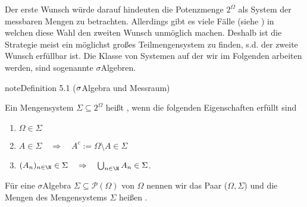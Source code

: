 \documentclass[letterpaper,10pt,german]{jupyterBook}
\begin{document}
\sphinxAtStartPar
Der erste Wunsch würde darauf hindeuten die Potenzmenge \(2^\Omega\) als System der messbaren Mengen zu betrachten. Allerdings gibt es viele Fälle (siehe {\hyperref[\detokenize{masstheorie/masstheorie:s-vitali}]{}}) in welchen diese Wahl den zweiten Wunsch unmöglich machen. Deshalb ist die Strategie meist ein möglichst großes Teilmengensystem zu finden, s.d. der zweite Wunsch erfüllbar ist. Die Klasse von Systemen auf der wir im Folgenden arbeiten werden, sind sogenannte \(\sigma\)\sphinxhyphen{}Algebren.
\label{masstheorie/masstheorie:def:sigmaalgebra}
\begin{sphinxadmonition}{note}{Definition 5.1 (\protect\(\sigma\protect\)\sphinxhyphen{}Algebra und Messraum)}



\sphinxAtStartPar
Ein Mengensystem \(\Sigma \subseteq 2^\Omega\) heißt , wenn die folgenden Eigenschaften erfüllt sind
\begin{enumerate}
%
\item {} 
\sphinxAtStartPar
\(\Omega\in \Sigma\)

\item {} 
\sphinxAtStartPar
\(A\in \Sigma \quad \Rightarrow \quad A^c:=\Omega \setminus A\in \Sigma\)

\item {} 
\sphinxAtStartPar
\((A_n)_{n\in\N} \in \Sigma \quad \Rightarrow \quad \bigcup_{n\in \N} A_n\in \Sigma\).

\end{enumerate}

\sphinxAtStartPar
Für eine \(\sigma\)\sphinxhyphen{}Algebra \(\Sigma \subseteq \mathcal{P}(\Omega)\) von \(\Omega\) nennen wir das Paar (\(\Omega,\Sigma\))  und die Mengen des Mengensystems \(\Sigma\) heißen .
\end{sphinxadmonition}
\end{document}
